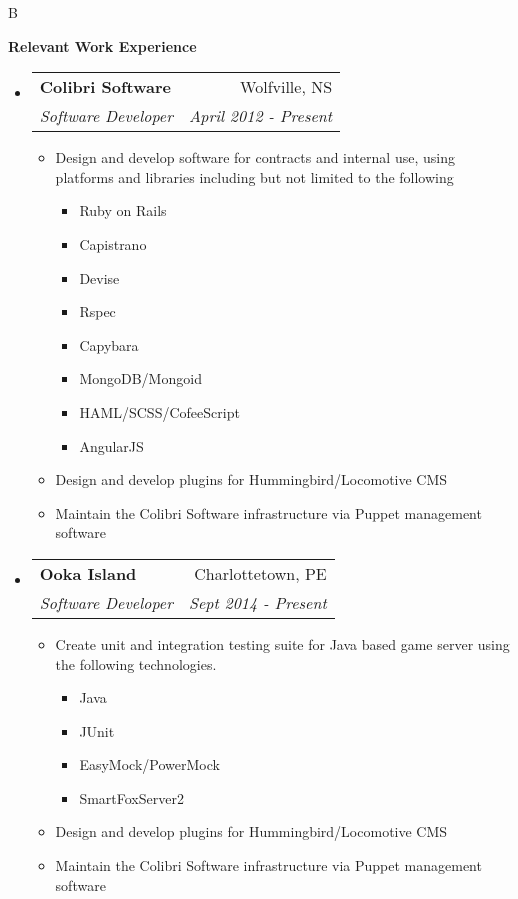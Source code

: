 \documentclass[letterpaper,11pt]{article}
\makeatletter
\newcommand{\resitem}[1]{\item #1 \vspace{-2pt}}
\newcommand{\resheading}[1]{{\large \colorbox{mygrey}{\begin{minipage}{\textwidth}{\textbf{#1 \vphantom{p\^{E}} }}\end{minipage}} }}
\newcommand{\ressubheading}[4]{
\begin{tabular*}{6.5in}{l@{\extracolsep{\fill}}r}
        \textbf{#1} & #2 \\
        \textit{#3} & \textit{#4} \\
\end{tabular*}\vspace{-6pt}}
\makeatother
\begin{document}
    B
\newpage
\mywebheader
\resheading{Relevant Work Experience} %
    \begin{itemize}
        \item[]
            \ressubheading{Colibri Software}{Wolfville, NS}{Software Developer}{April 2012 - Present}
                \begin{itemize}
                    \resitem{Design and develop software for contracts and internal use, using platforms and libraries including but not limited to the following}
                    \begin{itemize}
                      \resitem{Ruby on Rails}
                      \resitem{Capistrano}
                      \resitem{Devise}
                      \resitem{Rspec}
                      \resitem{Capybara}
                      \resitem{MongoDB/Mongoid}
                      \resitem{HAML/SCSS/CofeeScript}
                      \resitem{AngularJS}
                    \end{itemize}
                    \resitem{Design and develop plugins for Hummingbird/Locomotive CMS}
                    \resitem{Maintain the Colibri Software infrastructure via Puppet management software}
                \end{itemize}
        \item[]
            \ressubheading{Ooka Island}{Charlottetown, PE}{Software Developer}{Sept 2014 - Present}
                \begin{itemize}
                    \resitem{Create unit and integration testing suite for Java based game server using the following technologies.}
                    \begin{itemize}
                      \resitem{Java}
                      \resitem{JUnit}
                      \resitem{EasyMock/PowerMock}
                      \resitem{SmartFoxServer2}
                    \end{itemize}
                    \resitem{Design and develop plugins for Hummingbird/Locomotive CMS}
                    \resitem{Maintain the Colibri Software infrastructure via Puppet management software}
                \end{itemize}
\begin{comment}
        \item[]
            \ressubheading{76 Minas Sea Cadets (DND)}{Windsor, NS}{Administration Officer}{Sept. 2014 - Present}
                \begin{itemize}
                    \resitem{Employed organization skills in maintaining online database of cadet documentation to ensure easy and consistent transfer of data

\end{comment}
\end{itemize}
\end{document}
